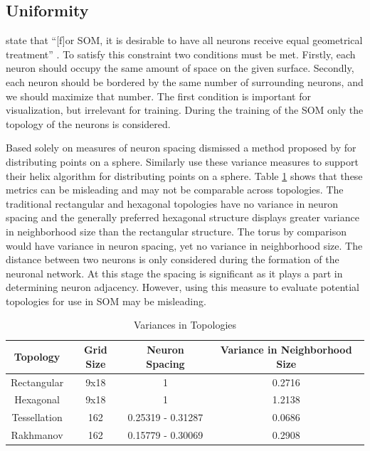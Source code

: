 \documentclass[10pt,titlepage]{article}
\begin{document}
\subsection{Uniformity}
\citeauthor{wu2006} state that ``[f]or SOM, it is desirable to have all neurons
receive equal geometrical treatment'' \cite[pp. 900]{wu2006}.  To satisfy this
constraint two conditions must be met.  Firstly, each neuron should occupy the
same amount of space on the given surface.  Secondly, each neuron should be
bordered by the same number of surrounding neurons, and we should maximize that
number.  The first condition is important for visualization, but
irrelevant for training.  During the training of the SOM only the topology of
the neurons is considered.

Based solely on measures of neuron spacing \cite{wu2005} dismissed a method
proposed by \cite{Rakhmanov94} for distributing points on a sphere.  Similarly
\cite{Nishio:2006fk} use these variance measures to support their helix
algorithm for distributing points on a sphere.  Table \ref{table1} shows that
these metrics can be misleading and may not be comparable across topologies.
The traditional rectangular and hexagonal topologies have no variance in neuron
spacing and the generally preferred hexagonal structure displays greater
variance in neighborhood size than the rectangular structure.  The torus by
comparison would have variance in neuron spacing, yet no variance in
neighborhood size.  The distance between two neurons is only considered during
the formation of the neuronal network.  At this stage the spacing is significant
as it plays a part in determining neuron adjacency. However, using this measure
to evaluate potential topologies for use in SOM may be misleading.

\begin{table}[htbp]
\caption{Variances in Topologies}
\begin{center}
\begin{tabular}{|c|c|c|c|}
\hline
Topology&Grid Size&Neuron Spacing&Variance in Neighborhood Size\\
\hline
Rectangular&9x18&1&0.2716\\
Hexagonal&9x18&1&1.2138\\
Tessellation&162&0.25319 - 0.31287& 0.0686\\
Rakhmanov&162&0.15779 - 0.30069& 0.2908\\
\hline
\end{tabular}
\end{center}
\label{table1}
\end{table}
\end{document}
